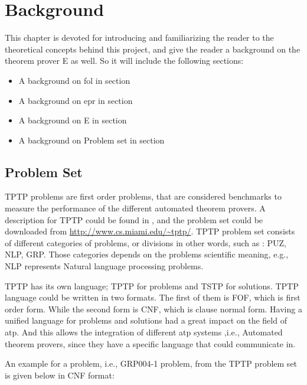 \chapter{Background}\label{chap:background}


This chapter is devoted for introducing and familiarizing the reader to the theoretical concepts behind this project, and give the reader a background on the theorem prover E as well. So it will include the following sections:
	\begin{itemize}
		\item A background on \acf{fol} in section %
		\item A background on \acf{epr} in section %
		\item A background on E in section %
		\item A background on Problem set in section %
	\end{itemize}






\section{Problem Set}
TPTP problems are first order problems, that are considered benchmarks to measure the performance of the different automated theorem provers. A description for TPTP could be found in \cite{TPTP09}, and the problem set could be downloaded from \url{http://www.cs.miami.edu/~tptp/}. TPTP problem set consists of different categories of problems, or divisions in other words, such as : PUZ, NLP, GRP. Those categories depends on the problems scientific meaning, e.g., NLP represents Natural language processing problems.


TPTP has its own language; TPTP for problems and TSTP for solutions. TPTP language could be written in two formats. The first of them is FOF, which is first order form. While the second form is CNF, which is clause normal form. Having a unified language for problems and solutions had a great impact on the field of \ac{atp}. And this allows the integration of different \ac{atp} systems ,i.e., Automated theorem provers, since they have a specific language that could communicate in.  


An example for a problem, i.e., GRP004-1 problem, from the TPTP problem set is given below in CNF format:

